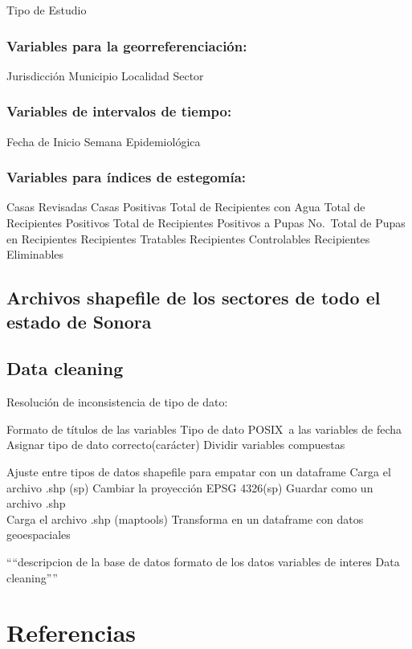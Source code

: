\documentclass[
  letterpaper,
]{scrbook}
\begin{document}
Tipo de Estudio

\subsection{Variables para la
georreferenciación:}\label{variables-para-la-georreferenciaciuxf3n}

Jurisdicción Municipio Localidad Sector

\subsection{Variables de intervalos de
tiempo:}\label{variables-de-intervalos-de-tiempo}

Fecha de Inicio Semana Epidemiológica

\subsection{Variables para índices de
estegomía:}\label{variables-para-uxedndices-de-estegomuxeda}

Casas Revisadas Casas Positivas Total de Recipientes con Agua Total de
Recipientes Positivos Total de Recipientes Positivos a Pupas No.~Total
de Pupas en Recipientes Recipientes Tratables Recipientes Controlables
Recipientes Eliminables

\section{Archivos shapefile de los sectores de todo el estado de
Sonora}\label{archivos-shapefile-de-los-sectores-de-todo-el-estado-de-sonora}

\section{Data cleaning}\label{data-cleaning}

Resolución de inconsistencia de tipo de dato:

Formato de títulos de las variables Tipo de dato POSIX~a las variables
de fecha Asignar tipo de dato correcto(carácter) Dividir variables
compuestas

Ajuste entre tipos de datos shapefile para empatar con un dataframe
Carga el archivo .shp (sp) Cambiar la proyección EPSG 4326(sp) Guardar
como un archivo .shp\\
Carga el archivo .shp (maptools) Transforma en un dataframe con datos
geoespaciales

````descripcion de la base de datos formato de los datos variables de
interes Data cleaning''''


\chapter{Referencias}\label{referencias}

\printbibliography[heading=none]


\backmatter
\end{document}
